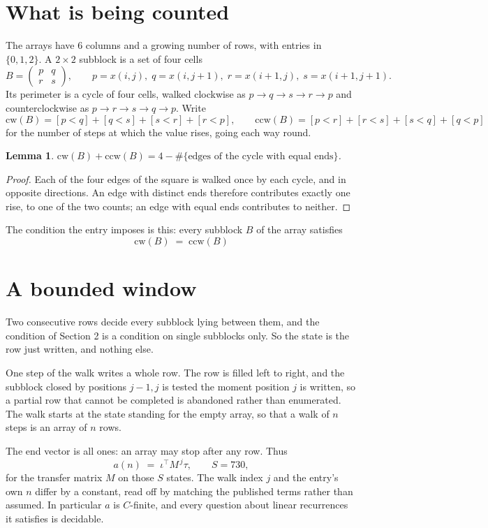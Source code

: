 \documentclass[11pt,a4paper]{article}
\theoremstyle{plain}
\newtheorem{lemma}[theorem]{Lemma}
\theoremstyle{definition}
\begin{document}
\section{What is being counted}

The arrays have $6$ columns and a growing number of rows, with entries in $\{0,1,2\}$. A
$2\times2$ subblock is a set of four cells
\[
B=\begin{pmatrix} p & q \\ r & s \end{pmatrix},
\qquad p=x(i,j),\; q=x(i,j+1),\; r=x(i+1,j),\; s=x(i+1,j+1).
\]
Its perimeter is a cycle of four cells, walked clockwise as $p\to q\to s\to r\to p$ and
counterclockwise as $p\to r\to s\to q\to p$. Write
\[
\mathrm{cw}(B)=[p<q]+[q<s]+[s<r]+[r<p],\qquad
\mathrm{ccw}(B)=[p<r]+[r<s]+[s<q]+[q<p]
\]
for the number of steps at which the value rises, going each way round.

\begin{lemma}\label{lem:sum}
$\mathrm{cw}(B)+\mathrm{ccw}(B)=4-\#\{\text{edges of the cycle with equal ends}\}$.
\end{lemma}

\begin{proof}
Each of the four edges of the square is walked once by each cycle, and in opposite directions.
An edge with distinct ends therefore contributes exactly one rise, to one of the two counts;
an edge with equal ends contributes to neither.
\end{proof}

The condition the entry imposes is this: every subblock $B$ of the array satisfies
\[
\mathrm{cw}(B)\;=\;\mathrm{ccw}(B)
\]


\section{A bounded window}

Two consecutive rows decide every subblock lying between them, and the condition of Section 2 is a condition on single subblocks only. So the state is the row just written, and nothing else.

One step of the walk writes a whole row. The row is filled left to right, and the subblock
closed by positions $j-1,j$ is tested the moment position $j$ is written, so a partial row that
cannot be completed is abandoned rather than enumerated. The walk starts at the state standing
for the empty array, so that a walk of $n$ steps is an array of $n$ rows.

The end vector is all ones: an array may stop after any row. Thus
\[
a(n)\;=\;\iota^{\!\top}M^{\,j}\tau ,\qquad S=730,
\]
for the transfer matrix $M$ on those $S$ states. The walk index $j$ and the entry's own $n$
differ by a constant, read off by matching the published terms rather than assumed. In
particular $a$ is $C$-finite, and every question about linear recurrences it satisfies is
decidable.
\end{document}
